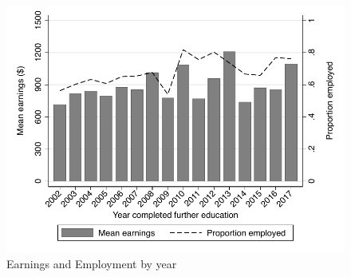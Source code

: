 \documentclass[12pt, a4paper]{article}
\begin{document}
\begin{figure}[htbp]
\centering
\caption{Earnings and Employment by year}
\vspace{0.5cm}
  \label{fig:yearearnempl}
    \includegraphics{_figures/mean_earnings_empl_year.pdf}
\end{figure}


%
%
\end{document}
